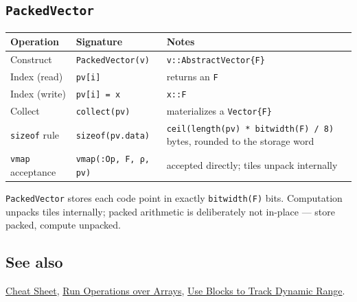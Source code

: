 \subsection{\texttt{PackedVector}}



\label{17791294993201593296}{}



\begin{table}[h]
\centering
\begin{tabulary}{\linewidth}{L L L}
\toprule
Operation & Signature & Notes \\
\toprule
Construct & \texttt{PackedVector(v)} & \texttt{v::AbstractVector\{F\}} \\
Index (read) & \texttt{pv[i]} & returns an \texttt{F} \\
Index (write) & \texttt{pv[i] = x} & \texttt{x::F} \\
Collect & \texttt{collect(pv)} & materializes a \texttt{Vector\{F\}} \\
\texttt{sizeof} rule & \texttt{sizeof(pv.data)} & \texttt{ceil(\allowbreak{}length(\allowbreak{}pv) * bitwidth(\allowbreak{}F) /\allowbreak{} 8)} bytes, rounded to the storage word \\
\texttt{vmap} acceptance & \texttt{vmap(:Op, F, ρ, pv)} & accepted directly; tiles unpack internally \\
\bottomrule
\end{tabulary}

\end{table}



\texttt{PackedVector} stores each code point in exactly \texttt{bitwidth(F)} bits. Computation unpacks tiles internally; packed arithmetic is deliberately not in-place — store packed, compute unpacked.



\subsection{See also}



\label{292862844209942199-dup13}{}


\href{help\_\allowbreak{}cheat\_\allowbreak{}sheet.md}{Cheat Sheet}, \href{workflow\_\allowbreak{}arrays.md}{Run Operations over Arrays}, \href{workflow\_\allowbreak{}blocks.md}{Use Blocks to Track Dynamic Range}.



